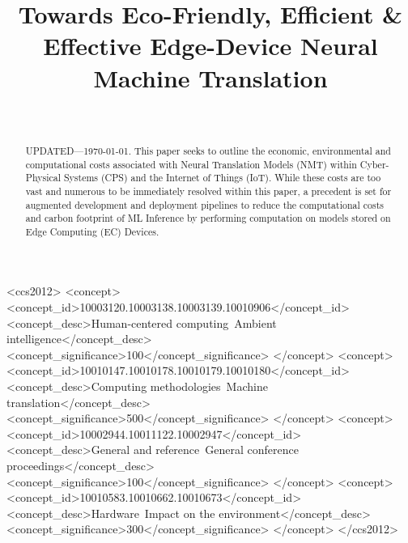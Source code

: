 \documentclass{sigchi}
\def\plaintitle{Towards Eco-Friendly, Efficient \& Effective Edge-Device Neural Machine Translation}
\begin{document}
\title{\plaintitle}

\author{%
  \\
}

\maketitle


\begin{abstract}
    UPDATED---\today. This paper seeks to outline the economic, environmental and computational costs associated with Neural Translation Models (NMT) within Cyber-Physical Systems (CPS) and the Internet of Things (IoT). While these costs are too vast and numerous to be immediately resolved within this paper, a precedent is set for augmented development and deployment pipelines to reduce the computational costs and carbon footprint of ML Inference by performing computation on models stored on Edge Computing (EC) Devices.
\end{abstract}



\begin{CCSXML}
<ccs2012>
   <concept>
       <concept_id>10003120.10003138.10003139.10010906</concept_id>
       <concept_desc>Human-centered computing~Ambient intelligence</concept_desc>
       <concept_significance>100</concept_significance>
       </concept>
   <concept>
       <concept_id>10010147.10010178.10010179.10010180</concept_id>
       <concept_desc>Computing methodologies~Machine translation</concept_desc>
       <concept_significance>500</concept_significance>
       </concept>
   <concept>
       <concept_id>10002944.10011122.10002947</concept_id>
       <concept_desc>General and reference~General conference proceedings</concept_desc>
       <concept_significance>100</concept_significance>
       </concept>
   <concept>
       <concept_id>10010583.10010662.10010673</concept_id>
       <concept_desc>Hardware~Impact on the environment</concept_desc>
       <concept_significance>300</concept_significance>
       </concept>
 </ccs2012>
\end{CCSXML}

\end{document}
